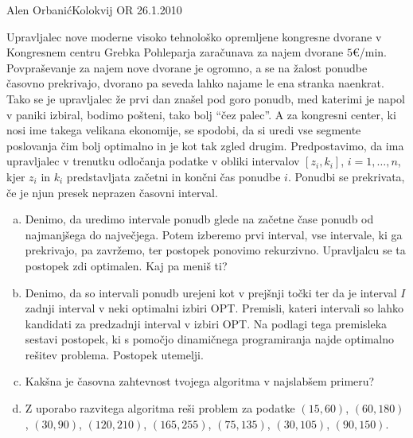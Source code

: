\begin{naloga}{Alen Orbanić}{Kolokvij OR 26.1.2010}
\begin{vprasanje}
Upravljalec nove moderne visoko tehnološko opremljene kongresne dvorane
v Kongresnem centru Grebka Pohleparja zaračunava za najem dvorane $5 €$/min.
Povpraševanje za najem nove dvorane je ogromno,
a se na žalost ponudbe časovno prekrivajo,
dvorano pa seveda lahko najame le ena stranka naenkrat.
Tako se je upravljalec že prvi dan znašel pod goro ponudb,
med katerimi je napol v paniki izbiral,
bodimo pošteni, tako bolj ``čez palec''.
A za kongresni center, ki nosi ime takega velikana ekonomije, se spodobi,
da si uredi vse segmente poslovanja čim bolj optimalno
in je kot tak zgled drugim.
Predpostavimo,
da ima upravljalec v trenutku odločanja podatke v obliki intervalov
$[z_i, k_i]$, $i = 1, \dots, n$,
kjer $z_i$ in $k_i$ predstavljata začetni in končni čas ponudbe $i$.
Ponudbi se prekrivata, če je njun presek neprazen časovni interval.

\begin{enumerate}[(a)]
\item Denimo, da uredimo intervale ponudb
glede na začetne čase ponudb od najmanjšega do največjega.
Potem izberemo prvi interval, vse intervale, ki ga prekrivajo, pa zavržemo,
ter postopek ponovimo rekurzivno.
Upravljalcu se ta postopek zdi optimalen. Kaj pa meniš ti?

\item Denimo, da so intervali ponudb urejeni kot v prejšnji točki
ter da je interval $I$ zadnji interval v neki optimalni izbiri OPT.
Premisli,
kateri intervali so lahko kandidati za predzadnji interval v izbiri OPT.
Na podlagi tega premisleka sestavi postopek,
ki s pomočjo dinamičnega programiranja najde optimalno rešitev problema.
Postopek utemelji.

\item Kakšna je časovna zahtevnost tvojega algoritma v najslabšem primeru?

\item Z uporabo razvitega algoritma reši problem za podatke
$(15, 60)$, $(60, 180)$, $(30, 90)$, $(120, 210)$,
$(165, 255)$, $(75, 135)$, $(30, 105)$, $(90, 150)$.
\end{enumerate}
\end{vprasanje}
\begin{odgovor}
\end{odgovor}
\end{naloga}

